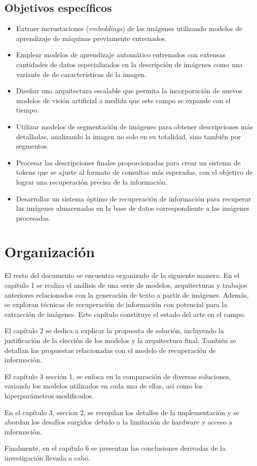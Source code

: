 \subsection*{Objetivos espec\'ificos}

\begin{itemize}
\item Extraer incrustaciones (\textit{embeddings}) de las im\'agenes utilizando modelos de aprendizaje de m\'aquinas previamente entrenados.
\item Emplear modelos de aprendizaje autom\'atico entrenados con extensas cantidades de datos especializados en la descripci\'on de im\'agenes como una variante de de caracter\'isticas de la imagen.
\item Dise\~nar una arquitectura escalable que permita la incorporaci\'on de nuevos modelos de visi\'on artificial a medida que este campo se expande con el tiempo.
\item Utilizar modelos de segmentaci\'on de im\'agenes para obtener descripciones m\'as detalladas, analizando la imagen no solo en su totalidad, sino tambi\'en por segmentos.
\item Procesar las descripciones finales proporcionadas para crear un sistema de tokens que se ajuste al formato de consultas m\'as esperadas, con el objetivo de lograr una recuperaci\'on precisa de la informaci\'on.
\item Desarrollar un sistema \'optimo de recuperaci\'on de informaci\'on para recuperar las im\'agenes almacenadas en la base de datos correspondiente a las im\'agenes procesadas.
\end{itemize}

\section*{Organizaci\'on}
El resto del documento se encuentra organizado de la siguiente manera. En el cap\'itulo 1 se realiza el an\'alisis de una serie de modelos, arquitecturas y trabajos anteriores relacionados con la generaci\'on de texto a partir de im\'agenes. Adem\'as, se exploran t\'ecnicas de recuperaci\'on de informaci\'on con potencial para la extracci\'on de im\'agenes. Este cap\'itulo constituye el estado del arte en el campo.

El cap\'itulo 2 se dedica a explicar la propuesta de soluci\'on, incluyendo la justificaci\'on de la elecci\'on de los modelos y la arquitectura final. Tambi\'en se detallan las propuestas relacionadas con el modelo de recuperaci\'on de informaci\'on.

El cap\'itulo 3 secci\'on 1, se enfoca en la comparaci\'on de diversas soluciones, variando los modelos utilizados en cada una de ellas, as\'i como los hiperpar\'ametros modificados.

En el cap\'itulo 3, seccion 2, se recopilan los detalles de la implementaci\'on y se abordan los desaf\'ios surgidos debido a la limitaci\'on de hardware y acceso a informaci\'on.

Finalmente, en el cap\'itulo 6 se presentan las conclusiones derivadas de la investigaci\'on llevada a cabo.

